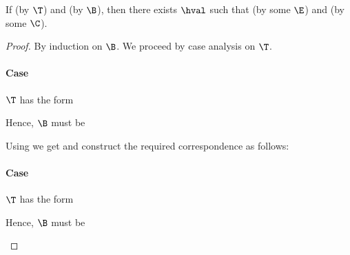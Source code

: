 \begin{lemma}[Soundness]
\label{lem:soundness-hb}
If \trahb{\hbctx}{\benv}{\hexp}{\bexp} (by $\T$) and \bev{\benv}{\bexp}{\bval} (by $\B$), then there exists $\hval$ such that \hev{\hexp}{\hval} (by some $\E$) and \corhb{\hbctx}{\bval}{\hval} (by some $\C$).
\end{lemma}

\begin{proof}

By induction on $\B$. We proceed by case analysis on $\T$.


\paragraph{Case \textnormal{}}
$\T$ has the form
\begin{prooftree}
\end{prooftree}
Hence, $\B$ must be
\begin{prooftree}
\end{prooftree}
Using  we get  and construct the required correspondence as follows:
\begin{prooftree}
\end{prooftree}


\paragraph{Case \textnormal{}}
$\T$ has the form
\begin{prooftree}
\end{prooftree}
Hence, $\B$ must be
\begin{prooftree}
\end{prooftree}


\end{proof}
